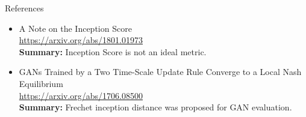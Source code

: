 \documentclass{beamer}
\begin{document}
\begin{frame}{References}
{\begin{itemize}
	\item A Note on the Inception Score \\
	\href{https://arxiv.org/abs/1801.01973}{https://arxiv.org/abs/1801.01973} \\
	\textbf{Summary:} Inception Score is not an ideal metric.
	
	\item GANs Trained by a Two Time-Scale Update Rule Converge to a Local Nash Equilibrium \\
	\href{https://arxiv.org/abs/1706.08500}{https://arxiv.org/abs/1706.08500} \\
	\textbf{Summary:} Frechet inception distance was proposed for GAN evaluation.
\end{itemize}
}
\end{frame}
\end{document}
